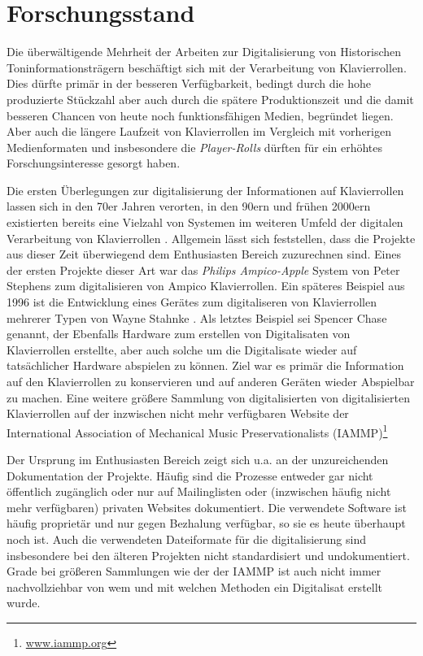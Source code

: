\section{Forschungsstand}

Die überwältigende Mehrheit der Arbeiten zur Digitalisierung von Historischen Toninformationsträgern beschäftigt sich mit der Verarbeitung von Klavierrollen.
Dies dürfte primär in der besseren Verfügbarkeit, bedingt durch die hohe produzierte Stückzahl aber auch durch die spätere Produktionszeit und die damit besseren Chancen von heute noch funktionsfähigen Medien, begründet liegen.
Aber auch die längere Laufzeit von Klavierrollen im Vergleich mit vorherigen Medienformaten und insbesondere die \textit{Player-Rolls} dürften für ein erhöhtes Forschungsinteresse gesorgt haben.

Die ersten Überlegungen zur digitalisierung der Informationen auf Klavierrollen lassen sich in den 70er Jahren verorten, in den 90ern und frühen 2000ern existierten bereits eine Vielzahl von Systemen im weiteren Umfeld der digitalen Verarbeitung von Klavierrollen \autocite[]{colmenares_2011}.
Allgemein lässt sich feststellen, dass die Projekte aus dieser Zeit überwiegend dem Enthusiasten Bereich zuzurechnen sind.
Eines der ersten Projekte dieser Art war das \textit{Philips Ampico-Apple} System von Peter Stephens \parencite*[]{stephens} zum digitalisieren von Ampico Klavierrollen.
Ein späteres Beispiel aus 1996 ist die Entwicklung eines Gerätes zum digitaliseren von Klavierrollen mehrerer Typen von Wayne Stahnke \parencite[]{stahnke_1996}.
Als letztes Beispiel sei Spencer Chase \parencite*[]{chase_2003} genannt, der Ebenfalls Hardware zum erstellen von Digitalisaten von Klavierrollen erstellte, aber auch solche um die Digitalisate wieder auf tatsächlicher Hardware abspielen zu können.
Ziel war es primär die Information auf den Klavierrollen zu konservieren und auf anderen Geräten wieder Abspielbar zu machen.
Eine weitere größere Sammlung von digitalisierten von digitalisierten Klavierrollen auf der inzwischen nicht mehr verfügbaren Website der International Association of Mechanical Music Preservationalists (IAMMP)\footnote{\href{http://www.iammp.org/}{www.iammp.org}}

Der Ursprung im Enthusiasten Bereich zeigt sich u.a. an der unzureichenden Dokumentation der Projekte.
Häufig sind die Prozesse entweder gar nicht öffentlich zugänglich oder nur auf Mailinglisten oder (inzwischen häufig nicht mehr verfügbaren) privaten Websites dokumentiert.
Die verwendete Software ist häufig proprietär und nur gegen Bezhalung verfügbar, so sie es heute überhaupt noch ist.
Auch die verwendeten Dateiformate für die digitalisierung sind insbesondere bei den älteren Projekten nicht standardisiert und undokumentiert.
Grade bei größeren Sammlungen wie der der IAMMP ist auch nicht immer nachvollziehbar von wem und mit welchen Methoden ein Digitalisat erstellt wurde.

